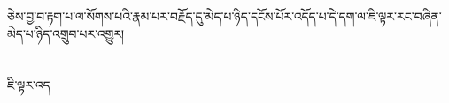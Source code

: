 ཅེས་བྱ་བ་རྟག་པ་ལ་སོགས་པའི་རྣམ་པར་བརྗོད་དུ་མེད་པ་ཉིད་དངོས་པོར་འདོད་པ་དེ་དག་ལ་ཇི་ལྟར་རང་བཞིན་མེད་པ་ཉིད་འགྲུབ་པར་འགྱུར།\chapter{ }ཇི་ལྟར་འད